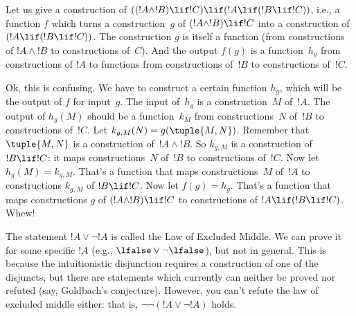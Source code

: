 \documentclass[../../../include/open-logic-section]{subfiles}
\begin{document}
\begin{ex}
Let us give a construction of $((!A \land !B) \lif !C) \lif (!A \lif
(!B \lif !C))$, i.e., a function $f$ which turns a construction~$g$ of
$(!A \land !B) \lif !C$ into a construction of $(!A \lif (!B \lif
!C))$. The construction $g$ is itself a function (from constructions
of $!A \land !B$ to constructions of~$C$). And the output $f(g)$ is a
function~$h_g$ from constructions of $!A$ to functions from constructions
of~$!B$ to constructions of~$!C$.

Ok, this is confusing.  We have to construct a certain function $h_g$,
which will be the output of $f$ for input~$g$. The input of~$h_g$ is a
construction~$M$ of~$!A$. The output of $h_g(M)$ should be a
function~$k_M$ from constructions~$N$ of~$!B$ to constructions
of~$!C$. Let $k_{g,M}(N) = g(\tuple{M, N})$. Remember that $\tuple{M,
  N}$ is a construction of~$!A \land !B$. So $k_{g,M}$ is a
construction of $!B \lif !C$: it maps constructions~$N$ of~$!B$ to
constructions of~$!C$.  Now let $h_g(M) = k_{g,M}$. That's a function
that maps constructions~$M$ of~$!A$ to constructions $k_{g,M}$ of $!B
\lif !C$. Now let $f(g) = h_g$. That's a function that maps
constructions $g$ of $(!A \land !B) \lif !C$ to constructions of $!A
\lif (!B \lif !C)$. Whew!{}
\end{ex}

The statement $!A \lor \lnot !A$ is called the Law of Excluded
Middle. We can prove it for some specific $!A$ (e.g., $\lfalse \lor
\lnot \lfalse$), but not in general. This is because the
intuitionistic disjunction requires a construction of one of the
disjuncts, but there are statements which currently can neither be
proved nor refuted (say, Goldbach's conjecture). However, you can't
refute the law of excluded middle either: that is, $\lnot \lnot (!A
\lor \lnot !A)$ holds.
\end{document}
